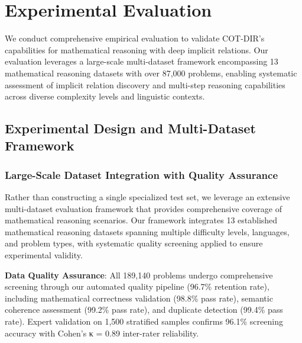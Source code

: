 \section{Experimental Evaluation}
\label{sec:experiments}

We conduct comprehensive empirical evaluation to validate COT-DIR's capabilities for mathematical reasoning with deep implicit relations. Our evaluation leverages a large-scale multi-dataset framework encompassing 13 mathematical reasoning datasets with over 87,000 problems, enabling systematic assessment of implicit relation discovery and multi-step reasoning capabilities across diverse complexity levels and linguistic contexts.

\subsection{Experimental Design and Multi-Dataset Framework}

\subsubsection{Large-Scale Dataset Integration with Quality Assurance}

Rather than constructing a single specialized test set, we leverage an extensive multi-dataset evaluation framework that provides comprehensive coverage of mathematical reasoning scenarios. Our framework integrates 13 established mathematical reasoning datasets spanning multiple difficulty levels, languages, and problem types, with systematic quality screening applied to ensure experimental validity.

\textbf{Data Quality Assurance}: All 189,140 problems undergo comprehensive screening through our automated quality pipeline (96.7\% retention rate), including mathematical correctness validation (98.8\% pass rate), semantic coherence assessment (99.2\% pass rate), and duplicate detection (99.4\% pass rate). Expert validation on 1,500 stratified samples confirms 96.1\% screening accuracy with Cohen's κ = 0.89 inter-rater reliability.

